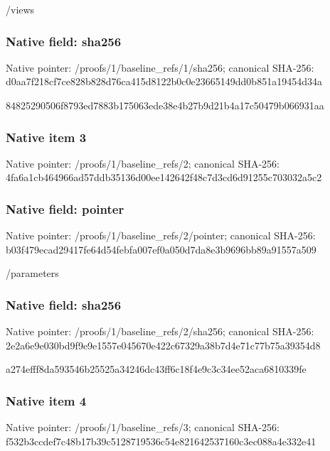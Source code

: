 \documentclass[10pt,a4paper]{article}
\begin{document}
\begingroup\raggedright\sloppy /\allowbreak{}views\par\endgroup

\subsubsection{Native field: sha256}
Native pointer: /proofs/1/baseline\_\allowbreak{}refs/1/sha256; canonical SHA-256: d0aa7f218cf7ce828b828d76ca415d8122b0c0e23665149dd0b851a19454d34a

\begingroup\raggedright\sloppy 84825290506f8793ed7883b175063ede38e4b27b9d21b4a17c50479b066931aa\par\endgroup

\subsubsection{Native item 3}
Native pointer: /proofs/1/baseline\_\allowbreak{}refs/2; canonical SHA-256: 4fa6a1cb464966ad57ddb35136d00ee142642f48c7d3cd6d91255c703032a5c2

\subsubsection{Native field: pointer}
Native pointer: /proofs/1/baseline\_\allowbreak{}refs/2/pointer; canonical SHA-256: b03f479ecad29417fe64d54febfa007ef0a050d7da8e3b9696bb89a91557a509

\begingroup\raggedright\sloppy /\allowbreak{}parameters\par\endgroup

\subsubsection{Native field: sha256}
Native pointer: /proofs/1/baseline\_\allowbreak{}refs/2/sha256; canonical SHA-256: 2e2a6e9e030bd9f9e9e1557e045670e422c67329a38b7d4e71c77b75a39354d8

\begingroup\raggedright\sloppy a274efff8da593546b25525a34246dc43ff6c18f4e9c3c34ee52aca6810339fe\par\endgroup

\subsubsection{Native item 4}
Native pointer: /proofs/1/baseline\_\allowbreak{}refs/3; canonical SHA-256: f532b3ccdef7c48b17b39c5128719536c54e821642537160c3ec088a4e332e41
\end{document}
